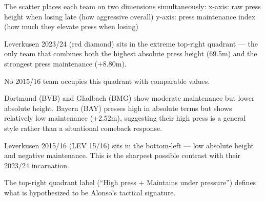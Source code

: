 \documentclass[
]{article}
\begin{document}
The scatter places each team on two dimensions simultaneously: x-axis:
raw press height when losing late (how aggressive overall) y-axis: press
maintenance index (how much they elevate press when losing)

Leverkusen 2023/24 (red diamond) sits in the extreme top-right quadrant
--- the only team that combines both the highest absolute press height
(69.5m) and the strongest press maintenance (+8.80m).

No 2015/16 team occupies this quadrant with comparable values.

Dortmund (BVB) and Gladbach (BMG) show moderate maintenance but lower
absolute height. Bayern (BAY) presses high in absolute terms but shows
relatively low maintenance (+2.52m), suggesting their high press is a
general style rather than a situational comeback response.

Leverkusen 2015/16 (LEV 15/16) sits in the bottom-left --- low absolute
height and negative maintenance. This is the sharpest possible contrast
with their 2023/24 incarnation.

The top-right quadrant label (``High press + Maintains under pressure'')
defines what is hypothesized to be Alonso's tactical signature.
\end{document}
